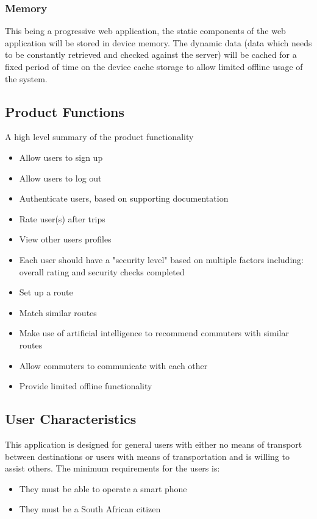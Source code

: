 \documentclass[a4paper]{article}
\begin{document}
    \subsubsection{Memory}
    
    This being a progressive web application, the static components of the web application will be stored in device memory. The dynamic data (data which needs to be constantly retrieved and checked against the server) will be cached for a fixed period of time on the device cache storage to allow limited offline usage of the system.
    
\subsection{Product Functions} 
	A high level summary of the product functionality
    \begin{itemize}
    	\item Allow users to sign up 
        \item Allow users to log out
        \item Authenticate users, based on supporting documentation
        \item Rate user(s) after trips
        \item View other users profiles
        \item Each user should have a "security level" based on multiple factors including: overall rating and security checks completed
        \item Set up a route
        \item Match similar routes
        \item Make use of artificial intelligence to recommend commuters with similar routes
        \item Allow commuters to communicate with each other
        \item Provide limited offline functionality
    \end{itemize}

\subsection{User Characteristics}
	This application is designed for general users with either no means of transport between destinations or users with means of transportation and is willing to assist others. The minimum requirements for the users is:
    \begin{itemize}
    	\item They must be able to operate a smart phone
        \item They must be a South African citizen
    \end{itemize}
\end{document}
